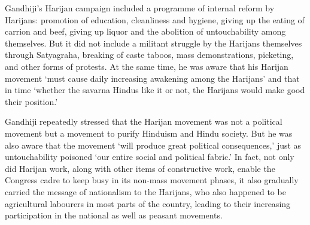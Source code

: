 \begin{multicols}{2}
Gandhiji's Harijan campaign included a programme of internal reform by Harijans: promotion of education, cleanliness and hygiene, giving up the eating of carrion and beef, giving up liquor and the abolition of untouchability among themselves. But it did not include a militant struggle by the Harijans themselves through Satyagraha, breaking of caste taboos, mass demonstrations, picketing, and other forms of protests. At the same time, he was aware that his Harijan movement `must cause daily increasing awakening among the Harijans' and that in time `whether the savarna Hindus like it or not, the Harijans would make good their position.'

Gandhiji repeatedly stressed that the Harijan movement was not a political movement but a movement to purify Hinduism and Hindu society. But he was also aware that the movement `will produce great political consequences,' just as untouchability poisoned `our entire social and political fabric.' In fact, not only did Harijan work, along with other items of constructive work, enable the Congress cadre to keep busy in its non-mass movement phases, it also gradually carried the message of nationalism to the Harijans, who also happened to be agricultural labourers in most parts of the country, leading to their increasing participation in the national as well as peasant movements.

\end{multicols}
